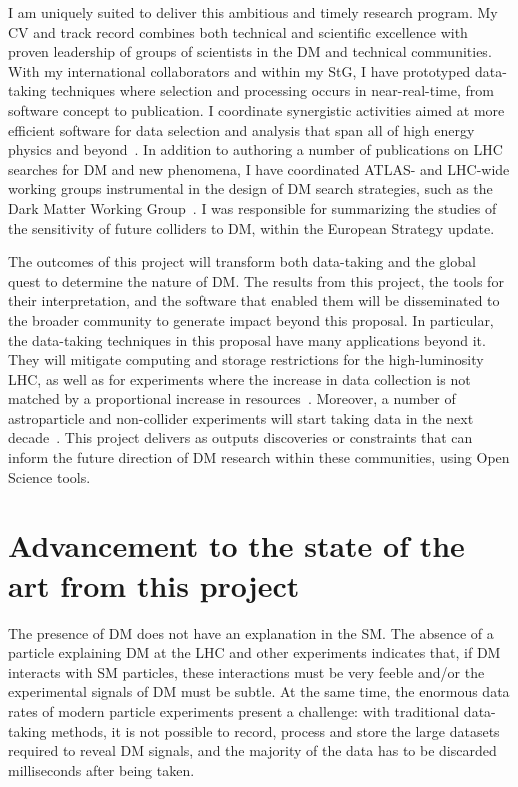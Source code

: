 \documentclass[11pt,a4paper]{article}
\begin{document}
I am uniquely suited to deliver this ambitious and timely research program. 
My CV and track record combines both technical and scientific excellence with proven leadership of groups of scientists in the DM and technical communities. 
With my international collaborators and within my StG, I have prototyped data-taking techniques where selection and processing occurs in near-real-time, from software concept to publication. %
I coordinate synergistic activities aimed at more efficient software for data selection and analysis that span all of high energy physics and beyond~\cite{Alves:2017she}. 
In addition to authoring a number of publications on LHC searches for DM and new phenomena,
I have coordinated ATLAS- and LHC-wide working groups instrumental in the design of DM search strategies, such as the Dark Matter Working Group~\cite{DMWGWebsite}. 
I was responsible for summarizing the studies of the sensitivity of future colliders to DM, within the European Strategy update. 

The outcomes of this project will transform both data-taking and the global quest to determine the nature of DM. 
The results from this project, the tools for their interpretation, and the software that enabled them  
will be disseminated to the broader community to generate impact beyond this proposal. 
In particular, the data-taking techniques in this proposal have many applications beyond it. They will mitigate computing and storage restrictions for the high-luminosity LHC, as well as for  experiments where the increase in data collection is not matched by a proportional increase in resources~\cite{Alves:2017she,Allen:2018yvz}. 
Moreover, a number of astroparticle and non-collider experiments will start taking data in the next decade~\cite{APPECStrategy,Beacham:2019nyx}. 
This project delivers as outputs discoveries or constraints that can inform the future direction of DM research within these communities, using Open Science tools. 

\section{Advancement to the state of the art from this project} 
\smallskip

The presence of DM does not have an explanation in the SM. 
The absence of a particle explaining DM at the LHC and other experiments indicates that, if DM interacts with SM particles, these interactions must be very feeble and/or the experimental signals of DM must be subtle. 
At the same time, the enormous data rates of modern particle experiments present a challenge: with traditional data-taking methods, it is not possible to record, process and store the large datasets required to reveal DM signals, and the majority of the data has to be discarded milliseconds after being taken. 
  
\end{document}
